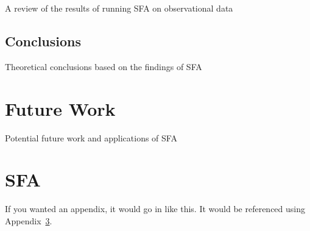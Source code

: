 \documentclass[12pt, oneside]{smuthesis}
\begin{document}
A review of the results of running SFA on observational data

\section{\sc Conclusions}

Theoretical conclusions based on the findings of SFA

\chapter{\sc Future Work}

Potential future work and applications of SFA


\appendix

\chapter{SFA}
\label{app:sfa}
If you wanted an appendix, it would go in like this.  It would be 
referenced using Appendix~\ref{app:sfa}.


\begin{singlespace}

\end{singlespace}
\end{document}
